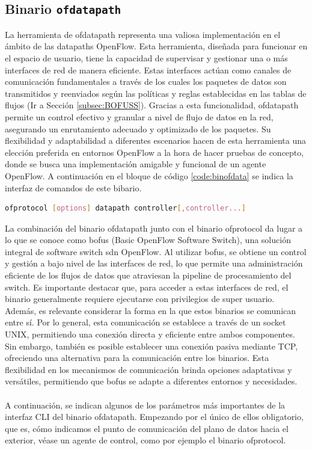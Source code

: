 \subsection{Binario \texttt{ofdatapath}}


La herramienta de ofdatapath representa una valiosa implementación en el ámbito de las datapaths OpenFlow. Esta herramienta, diseñada para funcionar en el espacio de usuario, tiene la capacidad de supervisar y gestionar una o más interfaces de red de manera eficiente. Estas interfaces actúan como canales de comunicación fundamentales a través de los cuales los paquetes de datos son transmitidos y reenviados según las políticas y reglas establecidas en las tablas de flujos (Ir a Sección \ref{subsec:BOFUSS}). Gracias a esta funcionalidad, ofdatapath permite un control efectivo y granular a nivel de flujo de datos en la red, asegurando un enrutamiento adecuado y optimizado de los paquetes. Su flexibilidad y adaptabilidad a diferentes escenarios hacen de esta herramienta una elección preferida en entornos OpenFlow a la hora de hacer pruebas de concepto, donde se busca una implementación amigable y funcional de un agente OpenFlow. A continuación en el bloque de código \ref{code:binofdata} se indica la interfaz de comandos de este bibario.\\

\begin{lstlisting}[language= bash, style=Consola, caption={Interfaz CLI del binario ofdatapath},label=code:binofdata]
    ofprotocol [options] datapath controller[,controller...]
\end{lstlisting}
\vspace{0.5cm}

La combinación del binario ofdatapath junto con el binario ofprotocol da lugar a lo que se conoce como \gls{bofus} (Basic OpenFlow Software Switch), una solución integral de software switch \gls{sdn} OpenFlow. Al utilizar \gls{bofus}, se obtiene un control y gestión a bajo nivel de las interfaces de red, lo que permite una administración eficiente de los flujos de datos que atraviesan la pipeline de procesamiento del switch. Es importante destacar que, para acceder a estas interfaces de red, el binario generalmente requiere ejecutarse con privilegios de super usuario. Además, es relevante considerar la forma en la que estos binarios se comunican entre sí. Por lo general, esta comunicación se establece a través de un socket UNIX, permitiendo una conexión directa y eficiente entre ambos componentes. Sin embargo, también es posible establecer una conexión pasiva mediante TCP, ofreciendo una alternativa para la comunicación entre los binarios. Esta flexibilidad en los mecanismos de comunicación brinda opciones adaptativas y versátiles, permitiendo que \gls{bofus} se adapte a diferentes entornos y necesidades. \\
\\
A continuación, se indican algunos de los parámetros más importantes de la interfaz CLI del binario ofdatapath. Empezando por el único de ellos obligatorio, que es, cómo indicamos el punto de comunicación del plano de datos hacia el exterior, véase un agente de control, como por ejemplo el binario ofprotocol.\\

